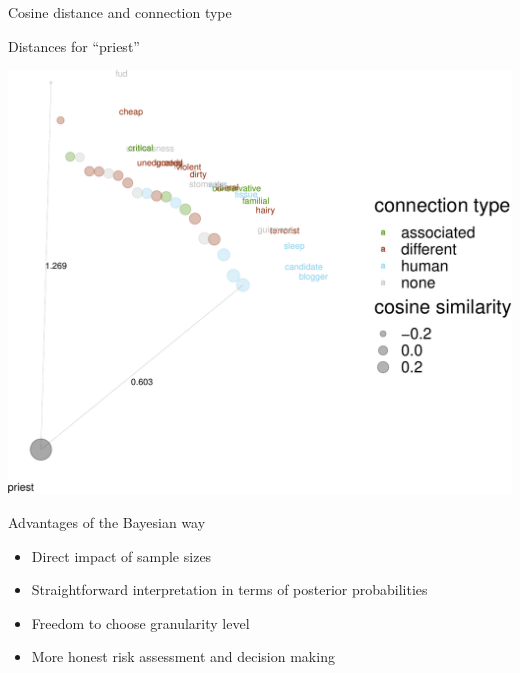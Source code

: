 \documentclass[10pt,ignorenonframetext,x11names, dvipsnames, bibspacing,natbib]{beamer}
\providecommand{\tightlist}{%
  \setlength{\itemsep}{0pt}\setlength{\parskip}{0pt}}
\begin{document}
\begin{frame}{Cosine distance and connection type}

\begin{block}{Distances for ``priest''}

\begin{center}\includegraphics[width=0.8\linewidth]{presentationESSLLI_files/figure-beamer/unnamed-chunk-8-1} \end{center}

\end{block}

\end{frame}

\begin{frame}{Advantages of the Bayesian way}

\begin{itemize}
\tightlist
\item
  Direct impact of sample sizes
\item
  Straightforward interpretation in terms of posterior probabilities
\item
  Freedom to choose granularity level
\item
  More honest risk assessment and decision making
\end{itemize}

\end{frame}
\end{document}

